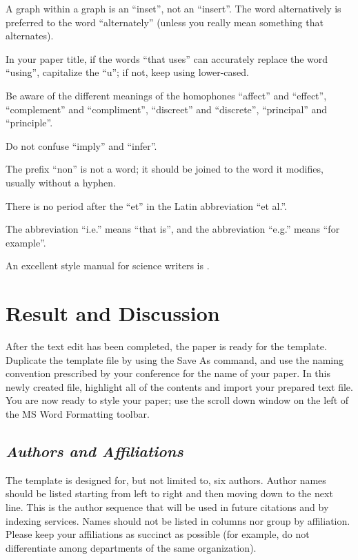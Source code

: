 \documentclass[10pt,conference,a4paper]{IEEEtran}
\let\oldsection\section
\let\oldsubsection\subsection
\renewcommand{\section}[1]{%
    \oldsection{#1}%
    \vspace{-4pt} %
}
\renewcommand{\subsection}[1]{%
    \oldsubsection{\textit{#1}}%
    \vspace{-3pt} %
}
\begin{document}
A graph within a graph is an ``inset'', not an ``insert''. The word alternatively is preferred to the word ``alternately'' (unless you really mean something that alternates).

In your paper title, if the words ``that uses'' can accurately replace the word ``using'', capitalize the ``u''; if not, keep using lower-cased.

Be aware of the different meanings of the homophones ``affect'' and ``effect'', ``complement'' and ``compliment'', ``discreet'' and ``discrete'', ``principal'' and ``principle''.

Do not confuse ``imply'' and ``infer''.

The prefix ``non'' is not a word; it should be joined to the word it modifies, usually without a hyphen.

There is no period after the ``et'' in the Latin abbreviation ``et al.''.

The abbreviation ``i.e.'' means ``that is'', and the abbreviation ``e.g.'' means ``for example''.

An excellent style manual for science writers is \cite{Eason1955}.

\section{Result and Discussion}

After the text edit has been completed, the paper is ready for the template. Duplicate the template file by using the Save As command, and use the naming convention prescribed by your conference for the name of your paper. In this newly created file, highlight all of the contents and import your prepared text file. You are now ready to style your paper; use the scroll down window on the left of the MS Word Formatting toolbar.

\subsection{Authors and Affiliations}

The template is designed for, but not limited to, six authors. Author names should be listed starting from left to right and then moving down to the next line. This is the author sequence that will be used in future citations and by indexing services. Names should not be listed in columns nor group by affiliation. Please keep your affiliations as succinct as possible (for example, do not differentiate among departments of the same organization).
\end{document}
